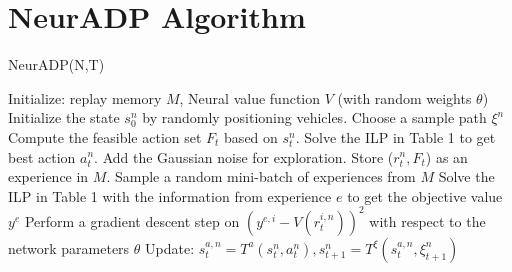 \appendix
\section{NeurADP Algorithm}
\label{appendix:NeurADP}
\label{sec:alg}
\begin{algorithm}[H]
        \caption{NeurADP(N,T)}
        \begin{algorithmic}[1]
        \State Initialize: replay memory $M$, Neural value function $V$ (with random weights $\theta$)
                    \State Initialize the state $s_0^n$ by randomly positioning vehicles.
                    \State Choose a sample path $\xi^n$
                                \State Compute the feasible action set $F_t$ based on $s_t^n$.
                                \State Solve the ILP in Table 1 to get best action $a_t^n$. Add the Gaussian noise for exploration.
                                \State Store ($r_t^n,F_t$) as an experience in $M$.
                                    \State Sample a random mini-batch of experiences from $M$
                                        \State Solve the ILP in Table 1 with the information from experience $e$ to get the objective value $y^e$
                                        \State Perform a gradient descent step on $(y^{e,i} - V(r_t^{i,n}))^2$ with respect to the network parameters $\theta$
                                        \EndFor
                                    \EndFor
                                \EndIf
                                \State Update: $s_t^{a,n}=T^a(s_t^n,a_t^n),s_{t+1}^n=T^\xi(s_t^{a,n},\xi_{t+1}^n)$
                        \EndFor
                \EndFor
        \end{algorithmic}
\end{algorithm}


